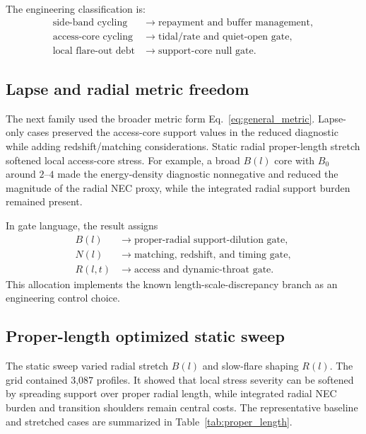 \documentclass[11pt]{article}
\begin{document}
The engineering classification is:
\begin{align}
 \text{side-band cycling} &\rightarrow \text{repayment and buffer management},\nonumber\\
 \text{access-core cycling} &\rightarrow \text{tidal/rate and quiet-open gate},\nonumber\\
 \text{local flare-out debt} &\rightarrow \text{support-core null gate}.\nonumber
\end{align}

\subsection{Lapse and radial metric freedom}

The next family used the broader metric form Eq.~\eqref{eq:general_metric}.  Lapse-only cases preserved the access-core support values in the reduced diagnostic while adding redshift/matching considerations.  Static radial proper-length stretch softened local access-core stress.  For example, a broad $B(l)$ core with $B_0$ around $2$--$4$ made the energy-density diagnostic nonnegative and reduced the magnitude of the radial NEC proxy, while the integrated radial support burden remained present.

In gate language, the result assigns
\begin{align}
 B(l) &\rightarrow \text{proper-radial support-dilution gate},\nonumber\\
 N(l) &\rightarrow \text{matching, redshift, and timing gate},\nonumber\\
 R(l,t) &\rightarrow \text{access and dynamic-throat gate}.\nonumber
\end{align}
This allocation implements the known length-scale-discrepancy branch as an engineering control choice.

\subsection{Proper-length optimized static sweep}

The static sweep varied radial stretch $B(l)$ and slow-flare shaping $R(l)$.  The grid contained 3,087 profiles.  It showed that local stress severity can be softened by spreading support over proper radial length, while integrated radial NEC burden and transition shoulders remain central costs.  The representative baseline and stretched cases are summarized in Table~\ref{tab:proper_length}.
\end{document}

